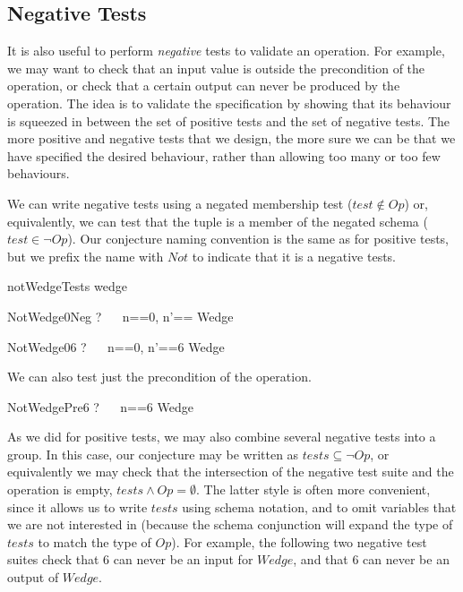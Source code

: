 \documentclass{llncs}
\begin{document}
\subsection{Negative Tests}

It is also useful to perform \emph{negative} tests to validate an
operation.  For example, we may want to check that an input value is
outside the precondition of the operation, or check that a certain output
can never be produced by the operation.  The idea is to validate the
specification by showing that its behaviour is squeezed in between the set
of positive tests and the set of negative tests.  The more positive and
negative tests that we design, the more sure we can be that we have
specified the desired behaviour, rather than allowing too many or too few
behaviours.

We can write negative tests using a negated membership test ($test \notin
Op$) or, equivalently, we can test that the tuple is a member of the negated
schema ($test \in \lnot Op$).
Our conjecture naming convention is the same as for positive tests, but
we prefix the name with $Not$ to indicate that it is a negative tests.

\begin{zsection}
  \SECTION notWedgeTests \parents wedge
\end{zsection}

\begin{theorem}{NotWedge0Neg}
\vdash? ~~ \lblot n==0, n'== \rblot \notin Wedge
\end{theorem}

\begin{theorem}{NotWedge06}
\vdash? ~~ \lblot n==0, n'==6 \rblot \in \lnot Wedge
\end{theorem}

We can also test just the precondition of the operation.
\begin{theorem}{NotWedgePre6}
\vdash? ~~ \lblot n==6 \rblot \notin \pre Wedge
\end{theorem}

As we did for positive tests, we may also combine several negative tests
into a group.  In this case, our conjecture may be written as $tests
\subseteq \lnot Op$, or equivalently we may check that the intersection of
the negative test suite and the operation is empty, $tests \land Op =
\emptyset$.  The latter style is often more convenient, since it allows us
to write $tests$ using schema notation, and to omit variables that we are
not interested in (because the schema conjunction will expand the type of
$tests$ to match the type of $Op$).  For example, the following two negative
test suites check that 6 can never be an input for $Wedge$, and that 6 can
never be an output of $Wedge$.
\end{document}
